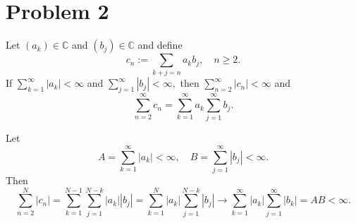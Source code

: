 \documentclass[11pt]{article}
\newcommand{\bbC}{\mathbb{C}}
\begin{document}
\section*{Problem 2}
\begin{problem}
    Let $(a_k) \in \bbC$ and $(b_j) \in \bbC$ and define 
    \[c_n := \sum_{k+j = n} a_kb_j, \quad n \geq 2.\] If $\sum_{k=1}^\infty |a_k| < \infty$ and $\sum_{j=1}^\infty |b_j| < \infty,$ then $\sum_{n=2}^\infty |c_n| <\infty$ and 
    \[\sum_{n=2}^\infty c_n = \sum_{k=1}^\infty a_k \sum_{j=1}^\infty b_j.\]
\end{problem}
\begin{solution}
    Let 
    \[A = \sum_{k=1}^\infty |a_k| < \infty, \quad B = \sum_{j=1}^\infty |b_j| < \infty.\] Then 
    \[\sum_{n=2}^N |c_n| = \sum_{k=1}^{N-1}\sum_{j=1}^{N-k}|a_k||b_j| = \sum_{k=1}^N|a_k| \sum_{j=1}^{N-k}|b_j| \to \sum_{k=1}^\infty |a_k| \sum_{j=1}^\infty |b_k| = AB < \infty.\]
     

\end{solution}
\end{document}
